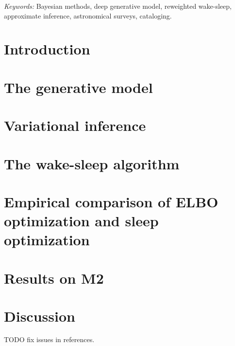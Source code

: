 \documentclass[12pt]{article}
\begin{document}
\noindent%
{\it Keywords:}  Bayesian methods, deep generative model, reweighted wake-sleep, approximate inference, astronomical surveys, cataloging. 
\vfill

\newpage
{} %
\section{Introduction}
\label{sec:intro}


\section{The generative model}
\label{sec:gen_model}


\section{Variational inference}
\label{sec:var_inference}


\section{The wake-sleep algorithm}
\label{sec:wake_sleep}



% 

\section{Empirical comparison of ELBO optimization and sleep optimization}

% 

\section{Results on M2}


\section{Discussion}
\label{sec:discussion}


TODO fix issues in references. 


\end{document}
